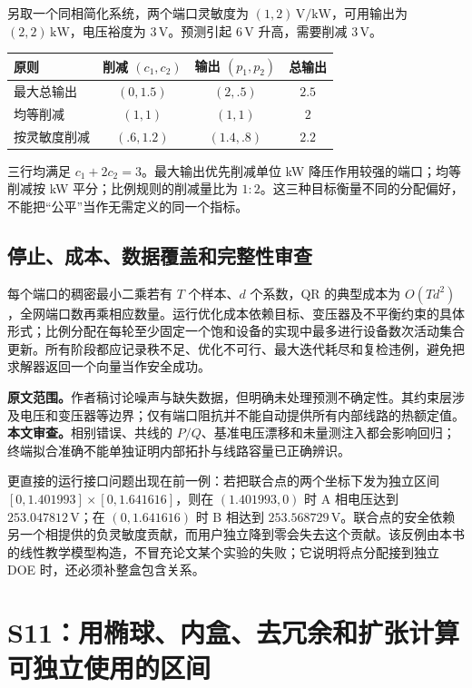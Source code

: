 \begin{example}
另取一个同相简化系统，两个端口灵敏度为 $(1,2)\,\mathrm{V/kW}$，可用输出为 $(2,2)\,\mathrm{kW}$，电压裕度为 $3\,\mathrm V$。预测引起 $6\,\mathrm V$ 升高，需要削减 $3\,\mathrm V$。
\begin{center}
\begin{tabular}{@{}lccc@{}}
\toprule
原则 & 削减 $(c_1,c_2)$ & 输出 $(p_1,p_2)$ & 总输出 \\
\midrule
最大总输出 & $(0,1.5)$ & $(2,.5)$ & $2.5$ \\
均等削减 & $(1,1)$ & $(1,1)$ & $2$ \\
按灵敏度削减 & $(.6,1.2)$ & $(1.4,.8)$ & $2.2$ \\
\bottomrule
\end{tabular}
\end{center}
三行均满足 $c_1+2c_2=3$。最大输出优先削减单位 kW 降压作用较强的端口；均等削减按 kW 平分；比例规则的削减量比为 $1:2$。这三种目标衡量不同的分配偏好，不能把“公平”当作无需定义的同一个指标。
\end{example}

\subsection{停止、成本、数据覆盖和完整性审查}

每个端口的稠密最小二乘若有 $T$ 个样本、$d$ 个系数，QR 的典型成本为 $O(Td^2)$，全网端口数再乘相应数量。运行优化成本依赖目标、变压器及不平衡约束的具体形式；比例分配在每轮至少固定一个饱和设备的实现中最多进行设备数次活动集合更新。所有阶段都应记录秩不足、优化不可行、最大迭代耗尽和复检违例，避免把求解器返回一个向量当作安全成功。

\textbf{原文范围。}作者稿讨论噪声与缺失数据，但明确未处理预测不确定性。其约束层涉及电压和变压器等边界；仅有端口阻抗并不能自动提供所有内部线路的热额定值。\textbf{本文审查。}相别错误、共线的 $P/Q$、基准电压漂移和未量测注入都会影响回归；终端拟合准确不能单独证明内部拓扑与线路容量已正确辨识。

更直接的运行接口问题出现在前一例：若把联合点的两个坐标下发为独立区间
$[0,1.401993]\times[0,1.641616]$，则在 $(1.401993,0)$ 时 A 相电压达到
$253.047812\,\mathrm V$；在 $(0,1.641616)$ 时 B 相达到
$253.568729\,\mathrm V$。联合点的安全依赖另一个相提供的负灵敏度贡献，而用户独立降到零会失去这个贡献。该反例由本书的线性教学模型构造，不冒充论文某个实验的失败；它说明将点分配接到独立 DOE 时，还必须补整盒包含关系。

\section{S11：用椭球、内盒、去冗余和扩张计算可独立使用的区间}
\label{sec:oe_s11}

